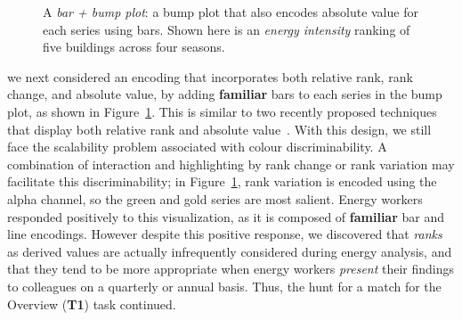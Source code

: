 \documentclass[journal]{vgtc}                %
\newcommand{\bstart}[1]{\vspace{1mm} \noindent{\textbf{#1:}}}
\begin{document}
\begin{figure}[ht]
	\centering
	\vspace{-0.15cm}
	\caption{A \textsl{bar + bump plot}: a bump plot that also encodes absolute value for each series using bars. Shown here is an \textsl{energy intensity} ranking of five buildings across four seasons.}
	\label{fig:sandbox-barbump}
	\vspace{-0.6cm}
\end{figure}

\bstart{Bump + bar plots} we next considered an encoding that incorporates both relative rank, rank change, and absolute value, by adding {\bf familiar} bars to each series in the bump plot, as shown in Figure~\ref{fig:sandbox-barbump}. 
This is similar to two recently proposed techniques that display both relative rank and absolute value~\cite{Gratzl2013,Hur2013}. 
With this design, we still face the scalability problem associated with colour discriminability.
A combination of interaction and highlighting by rank change or rank variation may facilitate this discriminability; in Figure~\ref{fig:sandbox-barbump}, rank variation is encoded using the alpha channel, so the green and gold series are most salient.
Energy workers responded positively to this visualization, as it is composed of {\bf familiar} bar and line encodings. 
However despite this positive response, we discovered that {\it ranks} as derived values are actually infrequently considered during energy analysis, and that they tend to be more appropriate when energy workers {\it present} their findings to colleagues on a quarterly or annual basis.
Thus, the hunt for a match for the Overview ({\bf T1}) task continued.
\end{document}
